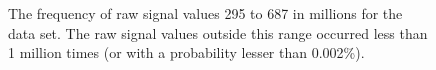\begin{figure}
	\centering

	\caption{\label{fig:data-hist}The frequency of raw signal values 295 to 687 in millions for the data set. The raw signal values outside this range occurred less than 1 million times (or with a probability lesser than 0.002\%).}
\end{figure}
